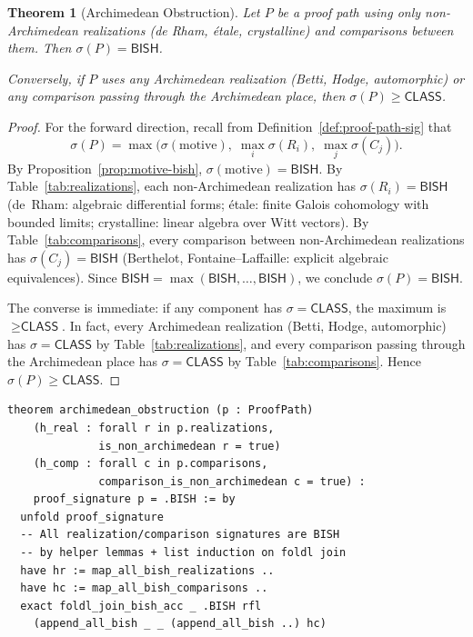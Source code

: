 \documentclass[11pt,a4paper]{article}
\theoremstyle{plain}
\newtheorem{theorem}{Theorem}[section]
\theoremstyle{definition}
\newcommand{\BISH}{\textsf{BISH}}
\newcommand{\CLASS}{\textsf{CLASS}}
\newcommand{\sig}{\sigma}
\begin{document}
\begin{theorem}[Archimedean Obstruction]\label{thm:archimedean}
Let $P$ be a proof path using only non-Archimedean realizations (de Rham, \'etale, crystalline) and comparisons between them. Then $\sig(P) = \BISH$.

Conversely, if $P$ uses any Archimedean realization (Betti, Hodge, automorphic) or any comparison passing through the Archimedean place, then $\sig(P) \geq \CLASS$.
\end{theorem}

\begin{proof}
For the forward direction, recall from Definition~\ref{def:proof-path-sig} that
\[
\sig(P) = \max\bigl(\sig(\text{motive}),\; \max_i \sig(R_i),\; \max_j \sig(C_j)\bigr).
\]
By Proposition~\ref{prop:motive-bish}, $\sig(\text{motive}) = \BISH$. By Table~\ref{tab:realizations}, each non-Archimedean realization has $\sig(R_i) = \BISH$ (de~Rham: algebraic differential forms; \'etale: finite Galois cohomology with bounded limits; crystalline: linear algebra over Witt vectors). By Table~\ref{tab:comparisons}, every comparison between non-Archimedean realizations has $\sig(C_j) = \BISH$ (Berthelot, Fontaine--Laffaille: explicit algebraic equivalences). Since $\BISH = \max(\BISH, \ldots, \BISH)$, we conclude $\sig(P) = \BISH$.

The converse is immediate: if any component has $\sig = \CLASS$, the maximum is $\geq \CLASS$. In fact, every Archimedean realization (Betti, Hodge, automorphic) has $\sig = \CLASS$ by Table~\ref{tab:realizations}, and every comparison passing through the Archimedean place has $\sig = \CLASS$ by Table~\ref{tab:comparisons}. Hence $\sig(P) \geq \CLASS$.
\end{proof}

\begin{tcolorbox}[leanbox={Lean: Archimedean Obstruction}]
\begin{Verbatim}[fontsize=\small]
theorem archimedean_obstruction (p : ProofPath)
    (h_real : forall r in p.realizations,
              is_non_archimedean r = true)
    (h_comp : forall c in p.comparisons,
              comparison_is_non_archimedean c = true) :
    proof_signature p = .BISH := by
  unfold proof_signature
  -- All realization/comparison signatures are BISH
  -- by helper lemmas + list induction on foldl join
  have hr := map_all_bish_realizations ..
  have hc := map_all_bish_comparisons ..
  exact foldl_join_bish_acc _ .BISH rfl
    (append_all_bish _ _ (append_all_bish ..) hc)
\end{Verbatim}
\end{tcolorbox}
\end{document}
